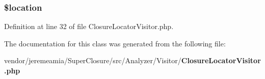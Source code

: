 \subsubsection[{\$location}]{\setlength{\rightskip}{0pt plus 5cm}\$location}\label{class_super_closure_1_1_analyzer_1_1_visitor_1_1_closure_locator_visitor_ac319193077976bb217112e5a7b7b8022}


Definition at line 32 of file Closure\+Locator\+Visitor.\+php.



The documentation for this class was generated from the following file\+:\begin{DoxyCompactItemize}
\item 
vendor/jeremeamia/\+Super\+Closure/src/\+Analyzer/\+Visitor/{\bf Closure\+Locator\+Visitor.\+php}\end{DoxyCompactItemize}
